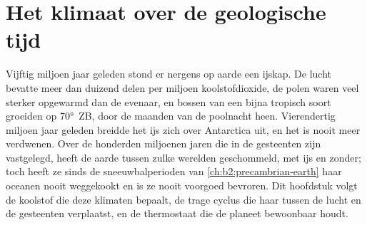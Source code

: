 \chapter{Het klimaat over de geologische tijd}\label{ch:b2:deep-time-climate}

Vijftig miljoen jaar geleden stond er nergens op aarde een ijskap. De lucht bevatte meer dan
duizend delen per miljoen koolstofdioxide, de polen waren veel sterker opgewarmd dan de evenaar, en
bossen van een bijna tropisch soort groeiden op \ang{70}~ZB, door de maanden van de poolnacht heen. Vierendertig
miljoen jaar geleden breidde het ijs zich over Antarctica uit, en het is nooit meer verdwenen. Over de honderden miljoenen
jaren die in de gesteenten zijn vastgelegd, heeft de aarde tussen zulke werelden geschommeld, met ijs en zonder; toch
heeft ze sinds de sneeuwbalperioden van \cref{ch:b2:precambrian-earth} haar oceanen nooit weggekookt en is ze nooit
voorgoed bevroren. Dit hoofdstuk volgt de koolstof die deze klimaten bepaalt, de trage
cyclus die haar tussen de lucht en de gesteenten verplaatst, en de thermostaat die de planeet
bewoonbaar houdt.

